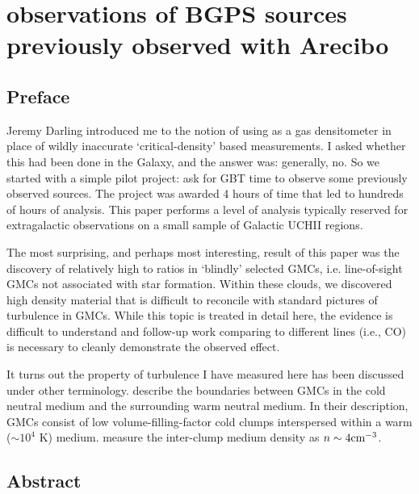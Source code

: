 
%
%

\chapter{\formaldehyde observations of BGPS sources previously observed with Arecibo}
\label{ch:h2co}
\section{Preface}
Jeremy Darling introduced me to the notion of using \formaldehyde as a gas
densitometer in place of wildly inaccurate `critical-density' based
measurements.  I asked whether this had been done in the Galaxy, and the
answer was: generally, no.  So we started with a simple pilot project:
ask for GBT time to observe some previously observed \formaldehyde sources.
The project was awarded 4 hours of time that led to hundreds of hours of analysis.
This paper performs a level of analysis typically reserved for extragalactic
observations on a small sample of Galactic UCHII regions.

The most surprising, and perhaps most interesting, result of this paper was the
discovery of relatively high \formaldehyde \twotwo to \oneone ratios in
`blindly' selected GMCs, i.e.  line-of-sight GMCs not associated with star
formation.  Within these clouds, we discovered high density material that is
difficult to reconcile with standard pictures of turbulence in GMCs.  While
this topic is treated in detail here, the evidence is difficult to understand
and follow-up work comparing to different lines (i.e., CO) is necessary to
cleanly demonstrate the observed effect.

It turns out the property of turbulence I have measured here has been discussed 
under other terminology.  \citet{Hennebelle2012a} describe the boundaries between
GMCs in the cold neutral medium and the surrounding warm neutral medium.  In their
description, GMCs consist of low volume-filling-factor cold clumps interspersed
within a warm ($\sim10^4$ K) medium. \citet{Williams1995a} measure the inter-clump
medium density as $n\sim4 \textrm{cm}^{-3}$.

\section{Abstract}

